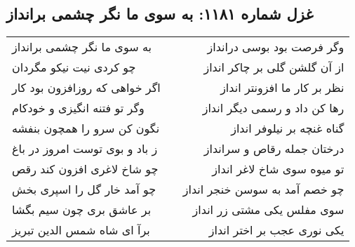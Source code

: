 \begin{center}
\section*{غزل شماره ۱۱۸۱: به سوی ما نگر چشمی برانداز}
\label{sec:1181}
\begin{longtable}{l p{0.5cm} r}
به سوی ما نگر چشمی برانداز
&&
وگر فرصت بود بوسی درانداز
\\
چو کردی نیت نیکو مگردان
&&
از آن گلشن گلی بر چاکر انداز
\\
اگر خواهی که روزافزون بود کار
&&
نظر بر کار ما افزونتر انداز
\\
وگر تو فتنه انگیزی و خودکام
&&
رها کن داد و رسمی دیگر انداز
\\
نگون کن سرو را همچون بنفشه
&&
گناه غنچه بر نیلوفر انداز
\\
ز باد و بوی توست امروز در باغ
&&
درختان جمله رقاص و سرانداز
\\
چو شاخ لاغری افزون کند رقص
&&
تو میوه سوی شاخ لاغر انداز
\\
چو آمد خار گل را اسپری بخش
&&
چو خصم آمد به سوسن خنجر انداز
\\
بر عاشق بری چون سیم بگشا
&&
سوی مفلس یکی مشتی زر انداز
\\
برآ ای شاه شمس الدین تبریز
&&
یکی نوری عجب بر اختر انداز
\\
\end{longtable}
\end{center}
